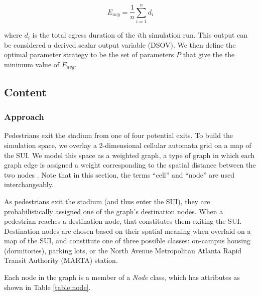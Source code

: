 \documentclass[12pt]{article}
\begin{document}
\begin{equation}
E_{avg} = \frac{1}{n}\sum\limits_{i=1}^n d_i
\end{equation}

where $d_i$ is the total egress duration of the $i$th simulation run. This
output can be considered a derived scalar output variable (DSOV). We then
define the optimal parameter strategy to be the set of parameters $P$ that
give the the minimum value of $E_{avg}$.

\subsection{Content}

\subsubsection{Approach}
Pedestrians exit the stadium from one of four potential exits. To build the
simulation space, we overlay a 2-dimensional cellular automata grid on a map of
the SUI. We model this space as a weighted graph, a type of graph in which each
graph edge is assigned a weight corresponding to the spatial distance between
the two nodes \cite{west2001introduction}. Note that in this
section, the terms ``cell'' and ``node'' are used interchangeably.

As pedestrians exit the stadium (and thus enter the SUI), they are
probabilistically assigned one of the graph’s destination nodes.  When a
pedestrian reaches a destination node, that constitutes them exiting the SUI.
Destination nodes are chosen based on their spatial meaning when overlaid on a
map of the SUI, and constitute one of three possible classes: on-campus housing
(dormitories), parking lots, or the North Avenue Metropolitan Atlanta Rapid
Transit Authority (MARTA) station.

Each node in the graph is a member of a \textit{Node} class, which
has attributes as shown in Table \ref{table:node}.
\end{document}
